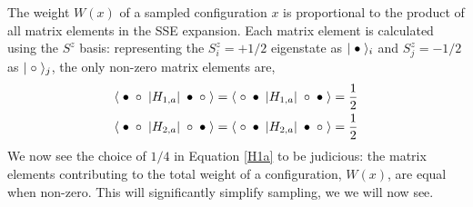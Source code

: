 \documentclass[vecphys]{svmult}
\begin{document}
The weight $W(x)$ of a sampled configuration $x$ is proportional to the product of all matrix elements in the SSE expansion.  Each matrix element is calculated using the $S^z$ basis: representing the $S^z_i=+1/2$ eigenstate as $|\hspace{1mm} \bullet \hspace{1mm} \rangle_i$ and  $S^z_j=-1/2$ as $|\hspace{1mm} \circ \hspace{1mm} \rangle_j$, the only non-zero matrix elements are,
\begin{eqnarray}
\langle \hspace{1mm} \bullet \hspace{1mm}  \circ \hspace{1mm}  | H_{1,a} | \hspace{1mm} \bullet \hspace{1mm} \circ \hspace{1mm} \rangle = 
\langle \hspace{1mm} \circ \hspace{1mm}  \bullet \hspace{1mm}  | H_{1,a} | \hspace{1mm} \circ \hspace{1mm} \bullet \hspace{1mm} \rangle = \frac{1}{2} \label {Hdiag} \\
\langle \hspace{1mm} \bullet \hspace{1mm}  \circ \hspace{1mm}  | H_{2,a} | \hspace{1mm} \circ \hspace{1mm} \bullet \hspace{1mm} \rangle =
\langle \hspace{1mm} \circ \hspace{1mm}  \bullet \hspace{1mm}  | H_{2,a} | \hspace{1mm} \bullet \hspace{1mm} \circ \hspace{1mm} \rangle =
\frac{1}{2} \label{Hod}
\end{eqnarray} 
We now see the choice of $1/4$ in Equation \ref{H1a} to be judicious: the matrix elements contributing to the total weight of a configuration, $W(x)$, are equal when non-zero.  This will significantly simplify sampling, we we will now see.
\end{document}
